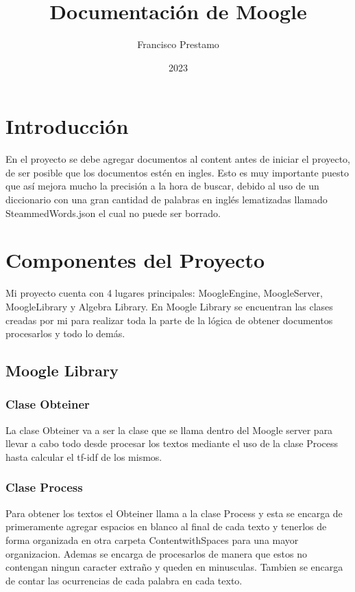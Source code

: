 \documentclass{article}
\title{Documentación de Moogle}
\author{Francisco Prestamo}
\date{2023}
\begin{document}
\maketitle

\section{Introducción}
En el proyecto se debe agregar documentos al content antes de iniciar el proyecto, de ser posible que los documentos estén en ingles. Esto es muy importante puesto que así mejora mucho la precisión a la hora de buscar, debido al uso de un diccionario con una gran cantidad de palabras en inglés lematizadas llamado SteammedWords.json el cual no puede ser borrado.

\section{Componentes del Proyecto}
Mi proyecto cuenta con 4 lugares principales: MoogleEngine, MoogleServer, MoogleLibrary y Algebra Library. En Moogle Library se encuentran las clases creadas por mi para realizar toda la parte de la lógica de obtener documentos procesarlos y todo lo demás.

\subsection{Moogle Library}

\subsubsection{Clase Obteiner}
La clase Obteiner va a ser la clase que se llama dentro del Moogle server para llevar a cabo todo desde procesar los textos mediante el uso de la clase Process hasta calcular el tf-idf de los mismos.

\subsubsection{Clase Process}
Para obtener los textos el Obteiner llama a la clase Process y esta se encarga de primeramente agregar espacios en blanco al final de cada texto y tenerlos de forma organizada en otra carpeta ContentwithSpaces para una mayor organizacion. Ademas se encarga de procesarlos de manera que estos no contengan ningun caracter extraño y queden en minusculas. Tambien se encarga de contar las ocurrencias de cada palabra en cada texto.
\end{document}
